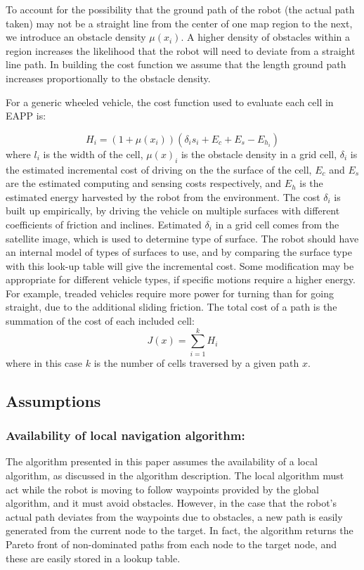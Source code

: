\documentclass[journal]{IEEEtran}
\begin{document}
To account for the possibility that the ground path of the robot (the actual path taken) may not be a straight line from the center of one map region to the next, we introduce an obstacle density $\mu(x_i)$. 
A higher density of obstacles within a region increases the likelihood that the robot will need to deviate from a straight line path. 
In building the cost function we assume that the length ground path increases proportionally to the obstacle density.

For a generic wheeled vehicle, the cost function used to evaluate each cell in EAPP is:

\begin{equation}
H_i = (1 + \mu(x_i))(\delta_i s_{i} + E_c + E_s - E_{h_i})
\end{equation}
where $l_i$ is the width of the cell, $\mu(x)_i$ is the obstacle density in a grid cell, $\delta_i$ is the estimated incremental cost of driving on the the surface of the cell, $E_c$ and $E_s$ are the estimated computing and sensing costs respectively, and $E_h$ is the estimated energy harvested by the robot from the environment. 
The cost $\delta_i$ is built up empirically, by driving the vehicle on multiple surfaces with different coefficients of friction and inclines.
Estimated $\delta_i$ in a grid cell comes from the satellite image, which is used to determine type of surface. 
The robot should have an internal model of types of surfaces to use, and by comparing the surface type with this  look-up table will give the incremental cost.
Some modification may be appropriate for different vehicle types, if specific motions require a higher energy. 
For example, treaded vehicles require more power for turning than for going straight, due to the additional sliding friction.
The total cost of a path is the summation of the cost of each included cell: 
\begin{equation}
J(x) = \sum_{i=1}^k H_i
\end{equation}
where in this case $k$ is the number of cells traversed by a given path $x$.

\subsection{Assumptions}
\subsubsection{Availability of local navigation algorithm:} The algorithm presented in this paper assumes the availability of a local algorithm, as discussed in the algorithm description. 
The local algorithm must act while the robot is moving to follow waypoints provided by the global algorithm, and it must avoid obstacles. 
However, in the case that the robot's actual path deviates from the waypoints due to obstacles, a new path is easily generated from the current node to the target. 
In fact, the algorithm returns the Pareto front of non-dominated paths from each node to the target node, and these are easily stored in a lookup table. 
\end{document}
